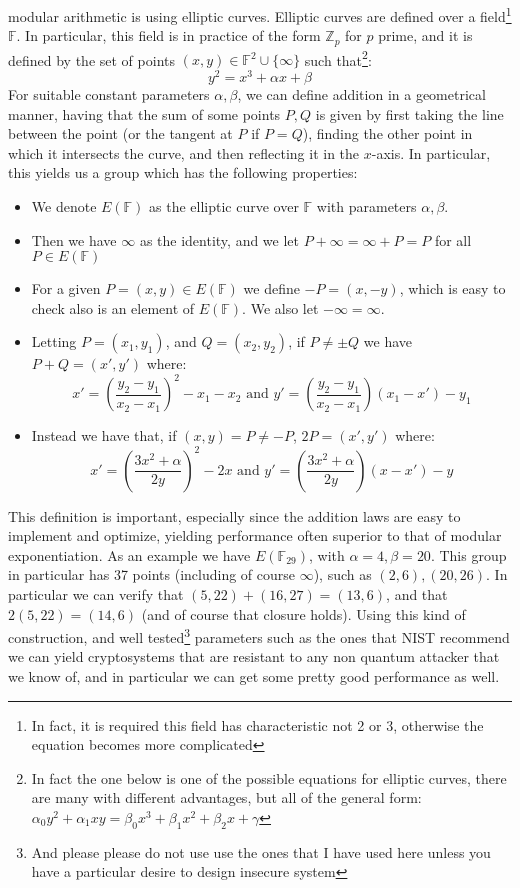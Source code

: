 \documentclass{article}
\begin{document}
modular arithmetic is using elliptic curves. Elliptic curves are defined over a field\footnote{In fact, it is required this 
field has characteristic not 2 or 3, otherwise the equation becomes more complicated} $\mathbb{F}$. In particular,
this field is in practice of the form $\mathbb{Z}_p$ for $p$ prime, and it is defined by the set of points $(x, y) \in \mathbb{F}^2 \cup \{ \infty \}$ such that\footnote{In fact the one below is
one of the possible equations for elliptic curves, there are many with different advantages, but all of the general form: $\alpha_0 y^2 + \alpha_1 xy = \beta_0 x^3 + \beta_1 x^2 + \beta_2 x + \gamma$}:
\[ y^2 = x^3 + \alpha x + \beta \]
For suitable constant parameters $\alpha, \beta$, we can define addition in a geometrical manner, having that the sum of some 
points $P, Q$ is given by first taking the line between the point (or the tangent at $P$ if $P = Q$), finding the other point in which 
it intersects the curve, and then reflecting it in the $x$-axis. In particular, this yields us a group which has the following properties:
\begin{itemize}
    \item We denote $E(\mathbb{F})$ as the elliptic curve over $\mathbb{F}$ with parameters $\alpha, \beta$.
    \item Then we have $\infty$ as the identity, and we let $P + \infty = \infty + P = P$ for all $P \in E(\mathbb{F})$
    \item For a given $P = (x, y) \in E(\mathbb{F})$ we define $-P = (x, -y)$, which is easy to check also is an element of $E(\mathbb{F})$. We also let $-\infty = \infty$.
    \item Letting $P = (x_1, y_1)$, and $Q = (x_2, y_2)$, if $P \neq \pm Q$ we have $P + Q = (x', y')$ where:
          \[ x' = \left(\frac{y_2 - y_1}{x_2 - x_1}\right)^2 - x_1 - x_2 \text{ and } y' = \left(\frac{y_2 - y_1}{x_2 - x_1}\right)(x_1 - x') - y_1  \]
    \item Instead we have that, if $(x, y) = P \neq -P$, $2P = (x', y')$ where:
          \[ x' = \left(\frac{3x^2 + \alpha}{2y}\right)^2 - 2x \text{ and } y' = \left(\frac{3x^2 + \alpha}{2y}\right)(x - x') - y  \]
\end{itemize}
This definition is important, especially since the addition laws are easy to implement and optimize, yielding performance 
often superior to that of modular exponentiation. As an example we have $E(\mathbb{F}_{29})$, with $\alpha=4, \beta=20$.
This group in particular has 37 points (including of course $\infty$), such as $(2,6), (20, 26)$. In particular we can 
verify that $(5, 22) + (16, 27) = (13, 6)$, and that $2(5, 22) = (14, 6)$ (and of course that closure holds).
Using this kind of construction, and well tested\footnote{And please please do not use use the ones that I have used here unless you have a particular desire to design insecure system}
parameters such as the ones that NIST recommend \cite{barkerRecommendationPairWiseKeyEstablishment2018}
we can yield cryptosystems that are resistant to any non quantum attacker that we know of, and in particular we can get some pretty good performance as well.
\end{document}
